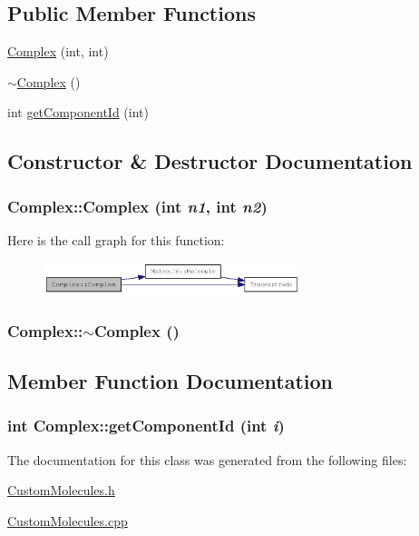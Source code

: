 \subsection*{Public Member Functions}
\begin{DoxyCompactItemize}
\item 
\hyperlink{classComplex_ad551ee48d65fa588fdaea8d5dd3f565c}{Complex} (int, int)
\item 
\hyperlink{classComplex_a70e14b17c92e3da779686b98f9f3bb2d}{$\sim$Complex} ()
\item 
int \hyperlink{classComplex_a87fc032569ab11bdf80a5ac3cabfd2fc}{getComponentId} (int)
\end{DoxyCompactItemize}


\subsection{Constructor \& Destructor Documentation}
\hypertarget{classComplex_ad551ee48d65fa588fdaea8d5dd3f565c}{
\subsubsection[{Complex}]{\setlength{\rightskip}{0pt plus 5cm}Complex::Complex (int {\em n1}, \/  int {\em n2})}}
\label{classComplex_ad551ee48d65fa588fdaea8d5dd3f565c}


Here is the call graph for this function:\nopagebreak
\begin{figure}[H]
\begin{center}
\leavevmode
\includegraphics[width=212pt]{classComplex_ad551ee48d65fa588fdaea8d5dd3f565c_cgraph}
\end{center}
\end{figure}
\hypertarget{classComplex_a70e14b17c92e3da779686b98f9f3bb2d}{
\subsubsection[{$\sim$Complex}]{\setlength{\rightskip}{0pt plus 5cm}Complex::$\sim$Complex ()}}
\label{classComplex_a70e14b17c92e3da779686b98f9f3bb2d}


\subsection{Member Function Documentation}
\hypertarget{classComplex_a87fc032569ab11bdf80a5ac3cabfd2fc}{
\subsubsection[{getComponentId}]{\setlength{\rightskip}{0pt plus 5cm}int Complex::getComponentId (int {\em i})}}
\label{classComplex_a87fc032569ab11bdf80a5ac3cabfd2fc}


The documentation for this class was generated from the following files:\begin{DoxyCompactItemize}
\item 
\hyperlink{CustomMolecules_8h}{CustomMolecules.h}\item 
\hyperlink{CustomMolecules_8cpp}{CustomMolecules.cpp}\end{DoxyCompactItemize}
